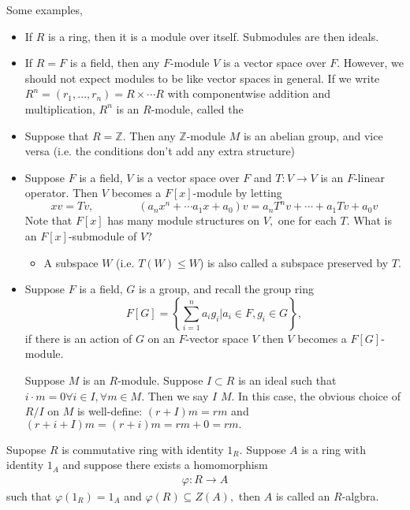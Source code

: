 \documentclass{article}
\numberwithin{equation}{section}
\begin{document}
Some examples,
\begin{itemize}
    \item If $R$ is a ring, then it is a module over itself. Submodules are then ideals.
    \item If $R=F$ is a field, then any $F$-module $V$ is a vector space over $F.$ 
    However, we should not expect modules to be like vector spaces in general. If we write $R^n = (r_1,\dots,r_n)=R \times \cdots R$ with componentwise addition and multiplication, $R^n$ is an $R$-module, called the 
    
    \item Suppose that $R=\mathbb{Z}.$ Then any $\mathbb{Z}$-module $M$ is an abelian group, and vice versa (i.e. the conditions don't add any extra structure)
    
    \item Suppose $F$ is a field, $V$ is a vector space over $F$ and $T:V\to V$ is an $F$-linear operator. Then $V$ becomes a $F[x]$-module by letting 
    \begin{equation}
        xv = Tv,\quad\quad\quad\quad (a_nx^n +\cdots a_1x + a_0)v = a_nT^nv + \cdots + a_1 Tv + a_0 v
    \end{equation}
    Note that $F[x]$ has many module structures on $V,$ one for each $T.$ What is an $F[x]$-submodule of $V$?
    \begin{itemize}
        \item A  subspace $W$ (i.e. $T(W) \le W$) is also called a subspace preserved by $T.$ 
    \end{itemize}
    \item Suppose $F$ is a field, $G$ is a group, and recall the group ring 
    \begin{equation}
        F[G] = \left\{\sum_{i=1}^n a_ig_i | a_i \in F,g_i \in G\right\},
    \end{equation}
    if there is an action of $G$ on an $F$-vector space $V$ then $V$ becomes a $F[G]$-module.

    Suppose $M$ is an $R$-module. Suppose $I\subset R$ is an ideal such that $i\cdot m=0 \forall i\in I,\forall m\in M.$ Then we say $I$  $M.$ In this case, the obvious choice of $R/I$ on $M$ is well-define: $(r+I)m=rm$ and $(r+i+I)m=(r+i)m=rm+0=rm.$ 
\end{itemize}
\begin{definition}
    Supopse $R$ is commutative ring with identity $1_R.$ Suppose $A$ is a ring with identity $1_A$ and suppose there exists a homomorphism 
    \begin{align*}
        \varphi: R\to A
    \end{align*}
    such that $\varphi(1_R)=1_A$ and $\varphi(R) \subseteq Z(A),$ then $A$ is called an $R$-algbra.
\end{definition}
\end{document}
